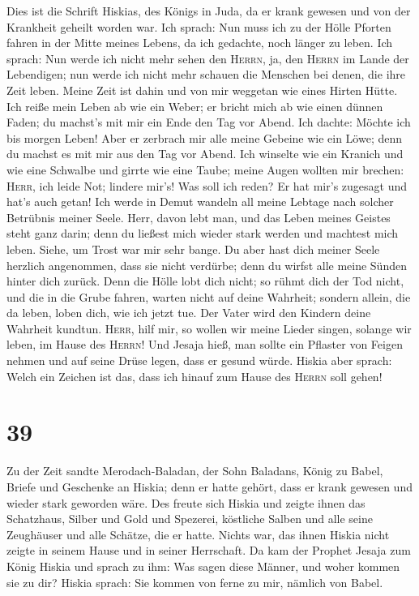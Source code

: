  Dies ist die Schrift Hiskias, des Königs in Juda, da er
krank gewesen und von der Krankheit geheilt worden war. 
Ich sprach: Nun muss ich zu der Hölle Pforten fahren in der Mitte meines
Lebens, da ich gedachte, noch länger zu leben.  Ich
sprach: Nun werde ich nicht mehr sehen den \textsc{Herrn}, ja, den
\textsc{Herrn} im Lande der Lebendigen; nun werde ich nicht mehr schauen
die Menschen bei denen, die ihre Zeit leben.  Meine Zeit
ist dahin und von mir weggetan wie eines Hirten Hütte. Ich reiße mein
Leben ab wie ein Weber; er bricht mich ab wie einen dünnen Faden; du
machst's mit mir ein Ende den Tag vor Abend.  Ich dachte:
Möchte ich bis morgen Leben! Aber er zerbrach mir alle meine Gebeine wie
ein Löwe; denn du machst es mit mir aus den Tag vor Abend.
 Ich winselte wie ein Kranich und wie eine Schwalbe und
girrte wie eine Taube; meine Augen wollten mir brechen: \textsc{Herr},
ich leide Not; lindere mir's!  Was soll ich reden? Er hat
mir's zugesagt und hat's auch getan! Ich werde in Demut wandeln all
meine Lebtage nach solcher Betrübnis meiner Seele.  Herr,
davon lebt man, und das Leben meines Geistes steht ganz darin; denn du
ließest mich wieder stark werden und machtest mich leben.
 Siehe, um Trost war mir sehr bange. Du aber hast dich
meiner Seele herzlich angenommen, dass sie nicht verdürbe; denn du
wirfst alle meine Sünden hinter dich zurück.  Denn die
Hölle lobt dich nicht; so rühmt dich der Tod nicht, und die in die Grube
fahren, warten nicht auf deine Wahrheit;  sondern allein,
die da leben, loben dich, wie ich jetzt tue. Der Vater wird den Kindern
deine Wahrheit kundtun.  \textsc{Herr}, hilf mir, so
wollen wir meine Lieder singen, solange wir leben, im Hause des
\textsc{Herrn}!  Und Jesaja hieß, man sollte ein Pflaster
von Feigen nehmen und auf seine Drüse legen, dass er gesund würde.
 Hiskia aber sprach: Welch ein Zeichen ist das, dass ich
hinauf zum Hause des \textsc{Herrn} soll gehen!

\hypertarget{section-38}{%
\section{39}\label{section-38}}

 Zu der Zeit sandte Merodach-Baladan, der Sohn Baladans,
König zu Babel, Briefe und Geschenke an Hiskia; denn er hatte gehört,
dass er krank gewesen und wieder stark geworden wäre.  Des
freute sich Hiskia und zeigte ihnen das Schatzhaus, Silber und Gold und
Spezerei, köstliche Salben und alle seine Zeughäuser und alle Schätze,
die er hatte. Nichts war, das ihnen Hiskia nicht zeigte in seinem Hause
und in seiner Herrschaft.  Da kam der Prophet Jesaja zum
König Hiskia und sprach zu ihm: Was sagen diese Männer, und woher kommen
sie zu dir? Hiskia sprach: Sie kommen von ferne zu mir, nämlich von
Babel.

